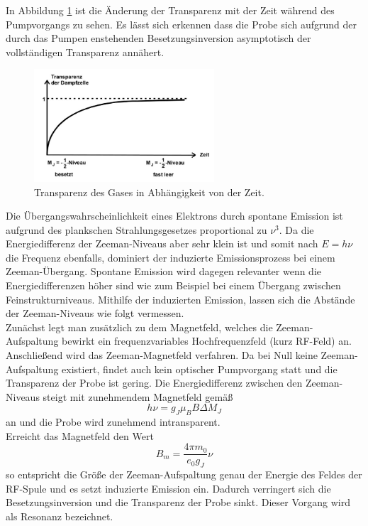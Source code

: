 In Abbildung \ref{fig:transzeit} ist die Änderung der Transparenz mit der Zeit während des Pumpvorgangs zu sehen. Es lässt sich erkennen dass die Probe sich aufgrund der durch das Pumpen enstehenden Besetzungsinversion asymptotisch der vollständigen Transparenz annähert.\\
\begin{figure}[H]
  \centering
  \includegraphics[width=0.6\textwidth]{plots/transzeit.JPG}
  \caption{Transparenz des Gases in Abhängigkeit von der Zeit\cite{Anleitung}.}
  \label{fig:transzeit}
\end{figure}
Die Übergangswahrscheinlichkeit eines Elektrons durch spontane Emission ist aufgrund des plankschen Strahlungsgesetzes proportional zu $\nu^3$. Da die Energiedifferenz der Zeeman-Niveaus aber sehr klein ist und somit nach $E=h\nu$ die Frequenz ebenfalls, dominiert der induzierte Emissionsprozess bei einem Zeeman-Übergang. Spontane Emission wird dagegen relevanter wenn die Energiedifferenzen höher sind wie zum Beispiel bei einem Übergang zwischen Feinstrukturniveaus. Mithilfe der induzierten Emission, lassen sich die Abstände der Zeeman-Niveaus wie folgt vermessen.\\
Zunächst legt man zusätzlich zu dem Magnetfeld, welches die Zeeman-Aufspaltung bewirkt ein frequenzvariables Hochfrequenzfeld (kurz RF-Feld) an. Anschließend wird das Zeeman-Magnetfeld  verfahren.
Da bei Null keine Zeeman-Aufspaltung existiert, findet auch kein optischer Pumpvorgang statt und die Transparenz der Probe ist gering.
Die Energiedifferenz zwischen den Zeeman-Niveaus steigt mit zunehmendem Magnetfeld gemäß
\begin{equation}
  h\nu = g_J \mu_B B \Delta M_J
\end{equation}
an und die Probe wird zunehmend intransparent. \\
Erreicht das Magnetfeld den Wert
\begin{equation}
  B_m = \frac{4\pi m_0}{e_0 g_J}\nu
\end{equation}
so entspricht die Größe der Zeeman-Aufspaltung genau der Energie des Feldes der RF-Spule und es setzt induzierte Emission ein. Dadurch verringert sich die Besetzungsinversion und die Transparenz der Probe sinkt. Dieser Vorgang wird als Resonanz bezeichnet.\\
